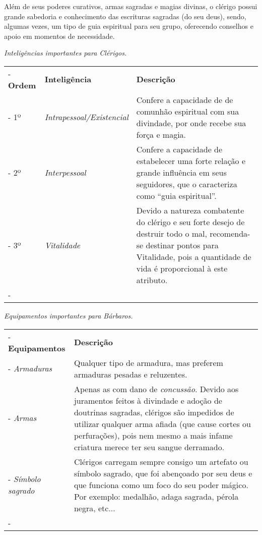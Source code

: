 Além de seus poderes curativos, armas sagradas e magias divinas, o clérigo possui grande sabedoria e conhecimento das escrituras sagradas (do seu deus), sendo, algumas vezes, um tipo de guia espiritual para seu grupo, oferecendo conselhos e apoio em momentos de necessidade.

\begin{table}[htb]
	\centering\smaller
	\emph{Inteligências importantes para Clérigos.} \\
	\begin{tabu} to \textwidth {|X[c 0.5]|X[1]|X[3]|} \tabucline-
		\textbf{Ordem}	& \textbf{Inteligência}	&	\textbf{Descrição}	\\ \tabucline-
		1º		& \emph{Intrapessoal/Existencial}  	& Confere a capacidade de de comunhão espiritual com sua divindade, por onde recebe sua força e magia. 	\\ \tabucline-
		2º		& \emph{Interpessoal} & Confere a capacidade de estabelecer uma forte relação e grande influência em seus seguidores, que o caracteriza como ``guia espiritual''. \\ \tabucline-
		3º		& \emph{Vitalidade} & Devido a natureza combatente do clérigo e seu forte desejo de destruir todo o mal, recomenda-se destinar pontos para Vitalidade, pois a quantidade de vida é proporcional à este atributo.\\ \tabucline-
	\end{tabu}
\end{table}

\begin{table}[htb]
	\centering\smaller
	\emph{Equipamentos importantes para Bárbaros.}
	\begin{tabu} to \textwidth {|X[0.5]|X[3]|} \tabucline-
		\textbf{Equipamentos}	&	\textbf{Descrição}	\\ \tabucline-
		\emph{Armaduras}  	& Qualquer tipo de armadura, mas preferem armaduras pesadas e reluzentes.	\\ \tabucline-
		\emph{Armas} & Apenas as com dano de \emph{concussão}. Devido aos juramentos feitos à divindade e adoção de doutrinas sagradas, clérigos são impedidos de utilizar qualquer arma afiada (que cause cortes ou perfurações), pois nem mesmo a mais infame criatura merece ter seu sangue derramado.\\ \tabucline-
		\emph{Símbolo sagrado} & Clérigos carregam sempre consigo um artefato ou símbolo sagrado, que foi abençoado por seu deus e que funciona como um foco do seu poder mágico. Por exemplo: medalhão, adaga sagrada, pérola negra, etc... \\ \tabucline-
	\end{tabu}
\end{table}

